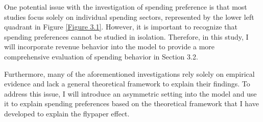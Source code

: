 One potential issue with the investigation of spending preference is that most studies focus solely on individual spending sectors, represented by the lower left quadrant in Figure \ref{Figure 3.1}. However, it is important to recognize that spending preferences cannot be studied in isolation. Therefore, in this study, I will incorporate revenue behavior into the model to provide a more comprehensive evaluation of spending behavior in Section 3.2.

Furthermore, many of the aforementioned investigations rely solely on empirical evidence and lack a general theoretical framework to explain their findings. To address this issue, I will introduce an asymmetric setting into the model and use it to explain spending preferences based on the theoretical framework that I have developed to explain the flypaper effect.



